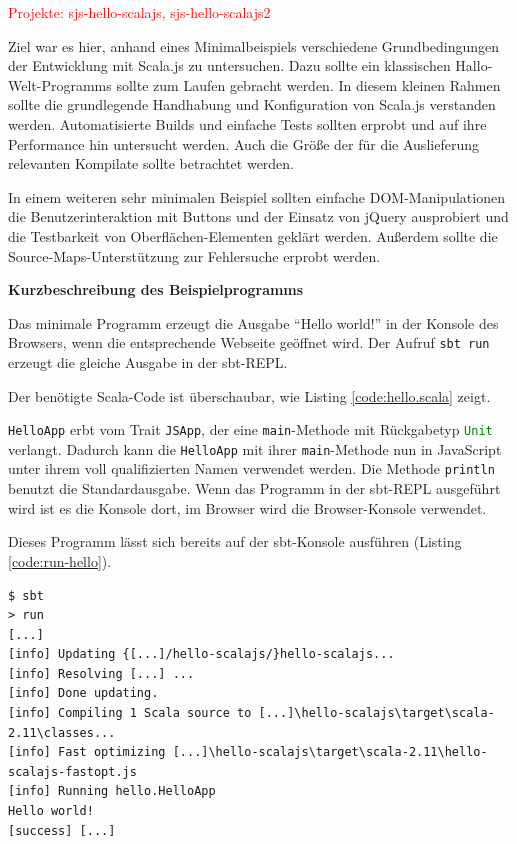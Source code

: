 \documentclass[a4paper, 12pt, hidelinks, listof=totoc, listoftables=totoc, bibliography=totoc]{scrreprt}
\newcommand{\code}[1]{\lstinline[language=Scala, style=inline]|#1|}
\newcommand{\scala}[1]{\lstinline[language=Scala, style=inline]|#1|}
\newcommand{\TODO}[1]{\textcolor{red}{#1}\newline}
\newcommand{\MyMiniSec}[1]{\rmfamily\fontsize{12}{15}\selectfont
	\vspace{7pt}\textbf{#1} %
}
\begin{document}

\TODO{Projekte: sjs-hello-scalajs, sjs-hello-scalajs2}

Ziel war es hier, anhand eines Minimalbeispiels verschiedene Grundbedingungen der Entwicklung mit Scala.js zu untersuchen. Dazu sollte ein klassischen Hallo-Welt-Programms sollte zum Laufen gebracht werden. In diesem kleinen Rahmen sollte die grundlegende Handhabung und Konfiguration von Scala.js verstanden werden. Automatisierte Builds und einfache Tests sollten erprobt und auf ihre Performance hin untersucht werden. Auch die Größe der für die Auslieferung relevanten Kompilate sollte betrachtet werden.

In einem weiteren sehr minimalen Beispiel sollten einfache \ac{DOM}-Manipulationen die Benutzerinteraktion mit Buttons und der Einsatz von jQuery ausprobiert und die Testbarkeit von Oberflächen-Elementen geklärt werden. Außerdem sollte die Source-Maps-Unterstützung zur Fehlersuche erprobt werden.


\MyMiniSec{Kurzbeschreibung des Beispielprogramms}

Das minimale Programm erzeugt die Ausgabe "`Hello world!"' in der Konsole des Browsers, wenn die entsprechende Webseite geöffnet wird. Der Aufruf \code{sbt run} erzeugt die gleiche Ausgabe in der sbt-\ac{REPL}.

Der benötigte Scala-Code ist überschaubar, wie Listing \ref{code:hello.scala} zeigt.



\scala{HelloApp} erbt vom Trait \scala{JSApp}, der eine \scala{main}-Methode mit Rückgabetyp \scala{Unit} verlangt. Dadurch kann die \scala{HelloApp} mit ihrer \scala{main}-Methode nun in JavaScript unter ihrem voll qualifizierten Namen verwendet werden. Die Methode \scala{println} benutzt die Standardausgabe. Wenn das Programm in der sbt-\ac{REPL} ausgeführt wird ist es die Konsole dort, im Browser wird die Browser-Konsole verwendet.

Dieses Programm lässt sich bereits auf der sbt-Konsole ausführen (Listing \ref{code:run-hello}).

\begin{lstlisting}[caption={Lauf des Hallo-Welt-Programms in der sbt-\ac{REPL}.}, label={code:run-hello}]
$ sbt
> run
[...]
[info] Updating {[...]/hello-scalajs/}hello-scalajs...
[info] Resolving [...] ...
[info] Done updating.
[info] Compiling 1 Scala source to [...]\hello-scalajs\target\scala-2.11\classes...
[info] Fast optimizing [...]\hello-scalajs\target\scala-2.11\hello-scalajs-fastopt.js
[info] Running hello.HelloApp
Hello world!
[success] [...]
\end{lstlisting}
\end{document}
